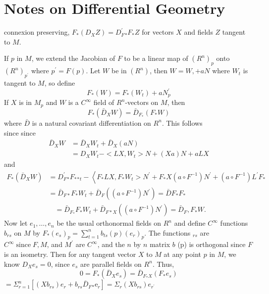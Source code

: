 \documentclass[10pt]{article}
\begin{document}
\section{Notes on Differential Geometry}
connexion preserving, $F_{*}\left(D_{X} Z\right)=D_{F}^{\prime}{ }_{*} F_{*} Z$ for vectors $X$ and fields $Z$ tangent to $M$.

If $p$ in $M$, we extend the Jacobian of $F$ to be a linear map of $\left(R^{n}\right)_{p}$ onto $\left(R^{n}\right)_{p^{\prime}}$ where $p^{\prime}=F(p)$. Let $W$ be in $\left(R^{n}\right)$, then $W=W,+a N$ where $W_{t}$ is tangent to $M$, so define
$$
F_{*}(W)=F_{*}\left(W_{t}\right)+a N_{p}^{\prime}
$$
If $X$ is in $M_{p}$ and $W$ is a $C^{\infty}$ field of $R^{n}$-vectors on $M$, then
$$
F_{*}\left(\bar{D}_{X} W\right)=\bar{D}_{F_{*}}\left(F_{*} W\right)
$$
where $\bar{D}$ is a natural covariant differentiation on $R^{n}$. This follows\\
since since
$$
\begin{aligned}
\bar{D}_{X} W &=\bar{D}_{X} W_{t}+\bar{D}_{X}(a N) \\
&=D_{X} W_{t}-<L X, W_{t}>N+(X a) N+a L X
\end{aligned}
$$
and
$$
\begin{aligned}
F_{*}\left(\bar{D}_{X} W\right) &=D_{F}^{\prime}{ }_{*} F_{*}{ }_{*}{ }_{t}-\left\langle F_{*} L X, F_{*} W_{t}>N^{\prime}+F_{*} X\left(a \circ F^{-1}\right) N^{\prime}+\left(a \circ F^{-1}\right) L^{\prime} F_{*}\right.\\
&=\bar{D}_{F *} F_{*} W_{t}+\bar{D}_{F}\left(\left(a \circ F^{-1}\right) N^{\prime}\right)=\bar{D} F_{*} F_{*}
\end{aligned}
$$
$$
\begin{aligned}
& =\bar{D}_{F_{*}} F_{*} W_{t}+\bar{D}_{F * X}\left(\left(a \circ F^{-1}\right) N^{\prime}\right)=\bar{D}_{F}, F_{*} W \text {. }
\end{aligned}
$$
Now let $e_{1}, \ldots, e_{n}$ be the usual orthonormal fields on $R^{n}$ and define $C^{\infty}$ functions $b_{r s}$ on $M$ by $F_{*}\left(e_{s}\right)_{p}=\sum_{t=1}^{n} b_{t s}(p)\left(e_{r}\right)_{p}$. The functions ${ }_{r s}$ are $C^{\infty} \operatorname{since} F, M$, and $M^{\prime}$ are $C^{\infty}$, and the $n$ by $n$ matrix $b$ (p) is orthogonal since $F$ is an isometry. Then for any tangent vector $X$ to $M$ at any point $p$ in $M$, we know $D_{X} e_{s}=0$, since $e_{s}$ are parallel fields on $R^{n}$. Thus,
$$
0=F_{*}\left(\bar{D}_{X} e_{s}\right)=\bar{D}_{F_{*} X}\left(F_{*} e_{s}\right)
$$
$=\Sigma_{r=1}^{n}\left[\left(X b_{r s}\right) e_{r}+b_{r s} \bar{D}_{F}{ }_{*} \mathrm{e}_{r}\right]=\Sigma_{r}\left(X b_{r s}\right) e_{r^{\prime}}$
\end{document}
